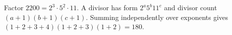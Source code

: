 Factor $2200=2^3\cdot5^2\cdot11$. A divisor has form $2^a5^b11^c$ and divisor count $(a+1)(b+1)(c+1)$. Summing independently over exponents gives $(1+2+3+4)(1+2+3)(1+2)=\boxed{180}$.
